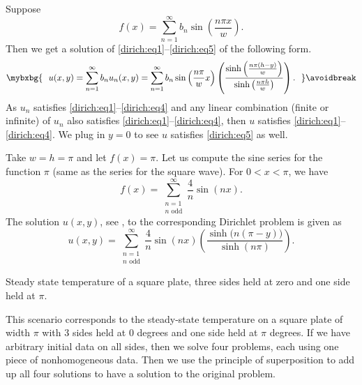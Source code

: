 Suppose
\begin{equation*}
f(x) =
\sum_{n=1}^\infty
b_n \sin \left( \frac{n \pi x }{w} \right) .
\end{equation*}
Then we get a solution of \eqref{dirich:eq1}--\eqref{dirich:eq5} of the
following form.
\begin{equation*}
\mybxbg{
~~
u(x,y) =
\sum_{n=1}^\infty
b_n u_n(x,y)
=
\sum_{n=1}^\infty
b_n 
\sin \left( \frac{n \pi}{w} x \right)
\left( \frac{\sinh \left( \frac{n \pi (h-y) }{w} \right)}%
{\sinh \left( \frac{n \pi h }{w} \right)} \right)
.
~~
}
\avoidbreak
\end{equation*}
As $u_n$ satisfies \eqref{dirich:eq1}--\eqref{dirich:eq4} and any linear
combination (finite or infinite) of $u_n$ also satisfies 
\eqref{dirich:eq1}--\eqref{dirich:eq4}, then $u$ satisfies
\eqref{dirich:eq1}--\eqref{dirich:eq4}.
We plug in $y=0$ to see $u$
satisfies 
\eqref{dirich:eq5} as well.

\begin{example}
Take $w=h=\pi$ and let $f(x) = \pi$.  Let us compute the sine
series for the function $\pi$ (same as the series for the square wave).
For $0 < x < \pi$, we have
\begin{equation*}
f(x) =
\sum_{\substack{n=1 \\ n \text{ odd}}}^\infty
\frac{4}{n}
\sin (n x) .
\end{equation*}
The solution $u(x,y)$, see ,
to the corresponding Dirichlet problem is
given as
\begin{equation*}
u(x,y) =
\sum_{\substack{n=1 \\ n \text{ odd}}}^\infty
\frac{4}{n}
\sin (n x)
\left( \frac{\sinh \bigl( n (\pi-y) \bigr) }{\sinh (n \pi)} \right)
.
\end{equation*}

\begin{myfig}
\capstart
{}
\caption{Steady state temperature of a square plate, three sides
held at zero and one side held at $\pi$.\label{dirichsquareplot:fig}}
\end{myfig}
\end{example}

This scenario
corresponds to the steady-state temperature on a square plate of width $\pi$
with 3 sides held at 0 degrees and one side held at $\pi$ degrees.
If we have arbitrary initial data on all sides, then we solve four problems,
each using one piece of nonhomogeneous data.  Then we use the principle of
superposition to add up all four solutions to have a solution to the
original problem.


